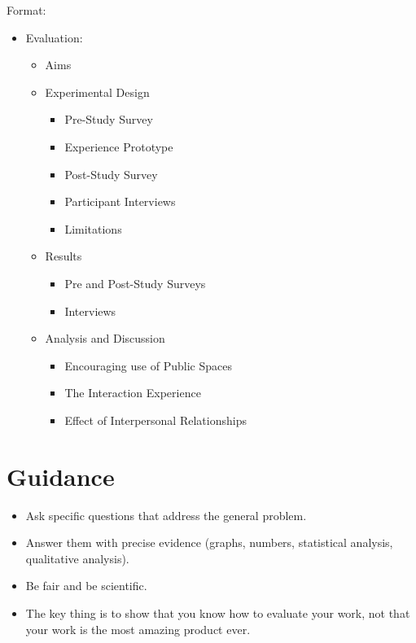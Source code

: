 \documentclass{l4proj}
\begin{document}
Format:
\begin{itemize}
    \item Evaluation:
    \begin{itemize}
        \item Aims
        \item Experimental Design
        \begin{itemize}
            \item Pre-Study Survey
            \item Experience Prototype
            \item Post-Study Survey
            \item Participant Interviews
            \item Limitations
        \end{itemize}
        \item Results
        \begin{itemize}
            \item Pre and Post-Study Surveys
            \item Interviews
        \end{itemize}
        \item Analysis and Discussion
        \begin{itemize}
            \item Encouraging use of Public Spaces
            \item The Interaction Experience
            \item Effect of Interpersonal Relationships
        \end{itemize}
    \end{itemize}
\end{itemize}

\section{Guidance}
\begin{itemize}
    \item
        Ask specific questions that address the general problem.
    \item
        Answer them with precise evidence (graphs, numbers, statistical
        analysis, qualitative analysis).
    \item
        Be fair and be scientific.
    \item
        The key thing is to show that you know how to evaluate your work, not
        that your work is the most amazing product ever.
\end{itemize}
\newpage
\end{document}
